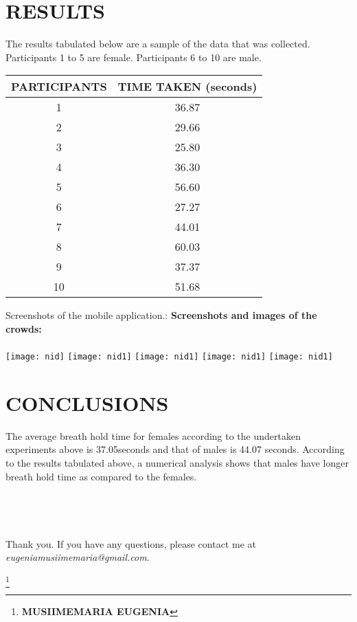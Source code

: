\documentclass[12pt, letterpaper]{article}
\begin{document}
\clearpage
\section{\textbf{RESULTS} } 
The results tabulated below are a sample of the data that was collected. Participants 1 to 5 are female. Participants 6 to 10 are male.
\begin{table}[ht]
 
\begin{tabular}{|c | c | }

\hline                        
PARTICIPANTS  & TIME TAKEN  (seconds) \\ [0.5ex]
\hline
1 & 36.87 \\
2 & 29.66 \\
3 & 25.80 \\
4 & 36.30 \\
5 & 56.60 \\  
6 & 27.27 \\
7 & 44.01 \\
8 & 60.03 \\
9 & 37.37 \\
10 & 51.68 \\  [1ex]
\hline
\end{tabular}
\end{table}

Screenshots of the mobile application.:
\clearpage
\textbf{Screenshots and images of the crowds:}\\ \\ 
\texttt{[image: nid]}
\texttt{[image: nid1]}
\texttt{[image: nid1]}
\texttt{[image: nid1]}
\texttt{[image: nid1]}

\section{\textbf{CONCLUSIONS} } 
The average breath hold time for females according to the undertaken experiments above is 37.05seconds and that of males is 44.07 seconds. According to the results tabulated above, a numerical analysis shows that males have  longer breath hold time as compared to the females.\\ \\ \\ \\ \\



Thank you. If you have any questions, please contact me at \emph{eugeniamusiimemaria@gmail.com}.

\footnote{\textbf{ MUSIIMEMARIA EUGENIA}}
\end{document}
